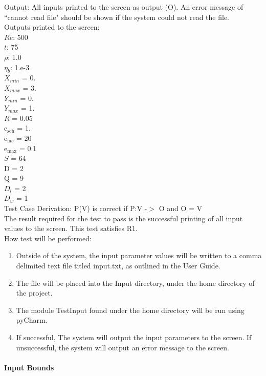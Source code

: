 \documentclass[12pt, titlepage]{article}
\begin{document}
\begin{enumerate}
					
Output: All inputs printed to the screen as output (O). An error message of ``cannot read file" should be shown if the system could not read the file.\\
Outputs printed to the screen:\\
$Re$: 500\\
$t$: 75\\
$\rho$: 1.0\\
$\eta_b$: 1.e-3\\
$X_{min}$ = 0.\\
$X_{max}$ = 3.\\
$Y_{min}$ = 0.\\
$Y_{max}$ = 1.\\
$R$ = 0.05\\
$\mathrm{e_{sch}}$ = 1.\\
$\mathrm{e_{fac}}$ = 20\\
$\mathrm{e_{max}}$ = 0.1\\
$S$ = 64\\
$\mathrm{D}$ = 2\\
$\mathrm{Q}$ = 9\\
$D_{l}$ = 2\\
$D_{w}$ = 1\\

Test Case Derivation: P(V) is correct if P:V -$>$ O and O = V\\

The result required for the test to pass is the successful printing of all input values to the screen. This test satisfies R1.\\
					
How test will be performed: 

\begin{enumerate}
\item Outside of the system, the input parameter values will be written to a comma delimited text file titled input.txt, as outlined in the User Guide.
\item The file will be placed into the Input directory, under the home directory of the project.
\item The module TestInput found under the home directory will be run using pyCharm.
\item If successful, The system will output the input parameters to the screen. If unsuccessful, the system will output an error message to the screen.
\end{enumerate}
\end{enumerate}
			
\paragraph{Input Bounds}
\end{document}
